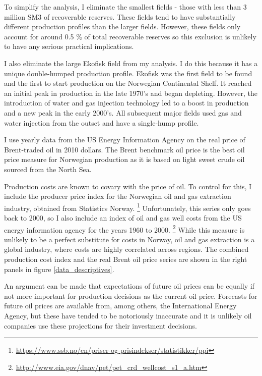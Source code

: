 \documentclass[12pt]{article}
\begin{document}
To simplify the analysis, I eliminate the smallest fields - those with less than 3 million SM3 of recoverable reserves.  These fields tend to have substantially different production profiles than the larger fields. However, these fields only account for around 0.5 \% of total recoverable reserves so this exclusion is unlikely to have any serious practical implications. 

I also eliminate the large Ekofisk field from my analysis.  I do this because it has a unique double-humped production profile. Ekofisk was the first field to be found and the first to start production on the Norwegian Continental Shelf.  It reached an initial peak in production in the late 1970's and began depleting. However, the introduction of water and gas injection technology led to a boost in production and a new peak in the early 2000's. All subsequent major fields used gas and water injection from the outset and have a single-hump profile.  

I use yearly data from the US Energy Information Agency on the real price of Brent-traded oil in 2010 dollars. The Brent benchmark oil price is the best oil price measure for Norwegian production as it is based on light sweet crude oil sourced from the North Sea.  

Production costs are known to covary with the price of oil.  To control for this, I include the producer price index for the Norwegian oil and gas extraction industry, obtained from Statistics Norway. \footnote{\url{https://www.ssb.no/en/priser-og-prisindekser/statistikker/ppi}} Unfortunately, this series only goes back to 2000, so I also include an index of oil and gas well costs from the US energy information agency for the years 1960 to 2000.  \footnote{\url{http://www.eia.gov/dnav/pet/pet_crd_wellcost_s1_a.htm}} While this measure is unlikely to be a perfect substitute for costs in Norway, oil and gas extraction is a global industry, where costs are highly correlated across regions. The combined production cost index and the real Brent oil price series are shown in the right panels in figure \ref{data_descriptives}.

An argument can be made that expectations of future oil prices can be equally if not more important for production decisions as the current oil price.  Forecasts for future oil prices are available from, among others, the International Energy Agency, but these have tended to be notoriously inaccurate and it is unlikely oil companies use these projections for their investment decisions.
\end{document}
